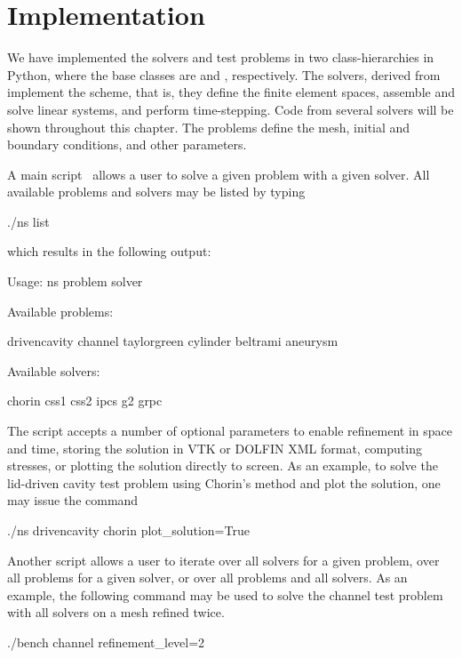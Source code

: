 \section{Implementation}

We have implemented the solvers and test problems in two
class-hierarchies in Python, where the base classes are
 and , respectively.  The solvers,
derived from  implement the scheme, that is, they
define the finite element spaces, assemble and solve linear systems,
and perform time-stepping. Code from several solvers will be shown
throughout this chapter. The problems define the mesh, initial and
boundary conditions, and other parameters.

A main script~ allows a user to solve a given problem with a
given solver. All available problems and solvers may be listed by
typing
\begin{python}
./ns list
\end{python}
which results in the following output:
\begin{python}
Usage: ns problem solver

Available problems:

  drivencavity
  channel
  taylorgreen
  cylinder
  beltrami
  aneurysm

Available solvers:

  chorin
  css1
  css2
  ipcs
  g2
  grpc
\end{python}

The  script accepts a number of optional parameters to enable
refinement in space and time, storing the solution in VTK or DOLFIN
XML format, computing stresses, or plotting the solution directly to
screen. As an example, to solve the lid-driven cavity test problem
using Chorin's method and plot the solution, one may issue the command
\begin{python}
./ns drivencavity chorin plot_solution=True
\end{python}

Another script  allows a user to iterate over all solvers
for a given problem, over all problems for a given solver, or over all
problems and all solvers. As an example, the following command may be
used to solve the channel test problem with all solvers on a mesh
refined twice.
\begin{python}
./bench channel refinement_level=2
\end{python}


